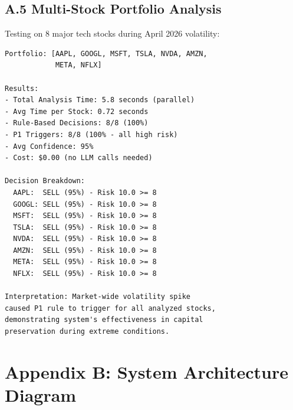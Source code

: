 \documentclass[11pt,letterpaper]{article}
\begin{document}
\subsection*{A.5 Multi-Stock Portfolio Analysis}

Testing on 8 major tech stocks during April 2026 volatility:

\begin{lstlisting}[caption={Batch Analysis Results}]
Portfolio: [AAPL, GOOGL, MSFT, TSLA, NVDA, AMZN, 
            META, NFLX]

Results:
- Total Analysis Time: 5.8 seconds (parallel)
- Avg Time per Stock: 0.72 seconds
- Rule-Based Decisions: 8/8 (100%)
- P1 Triggers: 8/8 (100% - all high risk)
- Avg Confidence: 95%
- Cost: $0.00 (no LLM calls needed)

Decision Breakdown:
  AAPL:  SELL (95%) - Risk 10.0 >= 8
  GOOGL: SELL (95%) - Risk 10.0 >= 8
  MSFT:  SELL (95%) - Risk 10.0 >= 8
  TSLA:  SELL (95%) - Risk 10.0 >= 8
  NVDA:  SELL (95%) - Risk 10.0 >= 8
  AMZN:  SELL (95%) - Risk 10.0 >= 8
  META:  SELL (95%) - Risk 10.0 >= 8
  NFLX:  SELL (95%) - Risk 10.0 >= 8

Interpretation: Market-wide volatility spike 
caused P1 rule to trigger for all analyzed stocks, 
demonstrating system's effectiveness in capital 
preservation during extreme conditions.
\end{lstlisting}

\section*{Appendix B: System Architecture Diagram}
\end{document}
